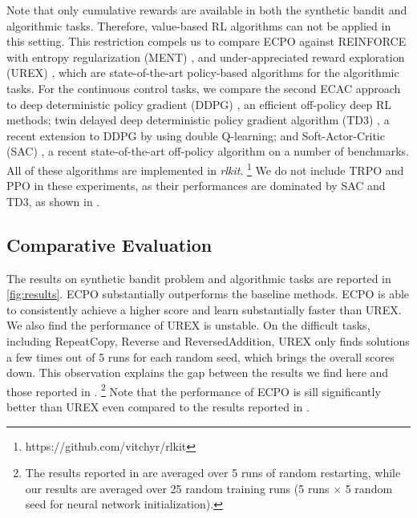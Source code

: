 Note that only cumulative rewards are available in both the
synthetic bandit and algorithmic tasks.
Therefore, value-based RL algorithms can not be applied in this setting.
This restriction compels us to compare ECPO against
REINFORCE with entropy regularization (MENT) \citep{williams1992simple},
and under-appreciated reward exploration (UREX) \citep{nachum2017improving}, which are state-of-the-art policy-based algorithms for the algorithmic tasks.
%
For the continuous control tasks, we compare the second ECAC approach
to deep deterministic policy gradient (DDPG) \citep{lillicrap2015continuous},
an efficient off-policy deep RL methods;
twin delayed deep deterministic policy gradient algorithm (TD3)
\citep{fujimoto2018addressing},
a recent extension to DDPG by using double Q-learning;
and Soft-Actor-Critic (SAC) \citep{haarnoja2018soft},
a recent state-of-the-art off-policy algorithm on a number of benchmarks.
All of these algorithms are implemented in \emph{rlkit}.%
%
\footnote{
https://github.com/vitchyr/rlkit
} 
We do not include TRPO and PPO in these experiments,
as their performances are dominated by SAC and TD3,
as shown in \citep{haarnoja2018soft,fujimoto2018addressing}. 

\subsection{Comparative Evaluation}

The results on synthetic bandit problem and algorithmic tasks are reported 
in \cref{fig:results}. 
ECPO substantially outperforms the baseline methods.
ECPO is able to consistently achieve a higher score and
learn substantially faster than UREX.
We also find the performance of UREX is unstable.
On the difficult tasks, including RepeatCopy, Reverse and ReversedAddition,
UREX only finds solutions a few times out of 5 runs for each random seed,
which brings the overall scores down.
This observation explains the gap between the results we find here
and those reported in \citet{nachum2017improving}.%
%
\footnote{
The results reported in \citep{nachum2017improving} are averaged over 
5 runs of random restarting,
while our results are averaged over 25 random training runs
(5 runs $\times$ 5 random seed for neural network initialization). 
}
Note that the performance of ECPO is sill significantly better than
UREX even compared to the results reported in \citet{nachum2017improving}. 

